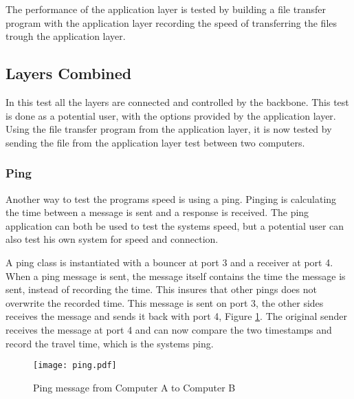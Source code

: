 The performance of the application layer is tested by building a file transfer program with the application layer recording the speed of transferring the files trough the application layer.

\subsection{Layers Combined}

In this test all the layers are connected and controlled by the backbone. This test is done as a potential user, with the options provided by the application layer. Using the file transfer program from the application layer, it is now tested by sending the file from the application layer test between two computers. 
\subsubsection{Ping}
Another way to test the programs speed is using a ping. Pinging is calculating the time between a message is sent and a response is received. The ping application can both be used to test the systems speed, but a potential user can also test his own system for speed and connection.

A ping class is instantiated with a bouncer at port 3 and a receiver at port 4. When a ping message is sent, the message itself contains the time the message is sent, instead of recording the time. This insures that other pings does not overwrite the recorded time. This message is sent on port 3, the other sides receives the message and sends it back with port 4, Figure \ref{fig:ping}. The original sender receives the message at port 4 and can now compare the two timestamps and record the travel time, which is the systems ping.


\begin{figure}[htb]
	\begin{center}
	\texttt{[image: ping.pdf]}%
	\caption{Ping message from Computer A to Computer B}
	\label{fig:ping}	
	\end{center}
\end{figure}

